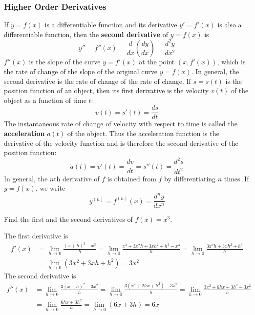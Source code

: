 \subsubsection*{Higher Order Derivatives}
 If \(y=f(x)\) is a differentiable function and its derivative \(y'=f'(x)\) is
 also a differentiable function,
 then the \textbf{second derivative} of \(y=f(x)\) is
\[y''=f''(x)=\frac{d}{dx}\left(\frac{dy}{dx}\right)=\frac{d^2y}{dx^2}\]
\(f''(x)\) is the slope of the curve \(y=f'(x)\) at the point \((x,f'(x))\),
which is the rate of change of the slope of the original curve \(y=f(x)\).
In general, the second derivative is the rate of change of the rate of change.
If \(s=s(t)\) is the position function of an object,
then its first derivative is the velocity \(v(t)\) of the object as a function
of time \(t\):
\[v(t)=s'(t)=\frac{ds}{dt}\]
The instantaneous rate of change of velocity with respect to time is called 
the \textbf{acceleration} \(a(t)\) of the object.
Thus the acceleration function is the derivative of the velocity
function and is therefore the second derivative of the position function:
\[a(t)=v'(t)=\frac{dv}{dt}=s''(t)=\frac{d^2s}{dt^2}\]
In general, the \(n\)th derivative of \(f\) is obtained from \(f\) by
differentiating \(n\) times.
If \(y=f(x)\), we write
\[y^{(n)}=f^{(n)}(x)=\frac{d^ny}{dx^n}\]
\begin{problem}
    Find the first and the second derivatives of \(f(x)=x^3\).
\end{problem}
\begin{solution}
    The first derivative is
    \begin{align*}
        f'(x) &= \lim_{h\to 0}\frac{(x+h)^3-x^3}{h}=\lim_{h\to 0}
        \frac{x^3+3x^2h+3xh^2+h^3-x^3}{h}
        =\lim_{h\to 0}\frac{3x^2h+3xh^2+h^3}{h} \\
        &= \lim_{h\to 0}(3x^2+3xh+h^2)=3x^2
    \end{align*}
    The second derivative is
    \begin{align*}
        f''(x) &= \lim_{h\to 0}\frac{3(x+h)^2-3x^2}{h}
        =\lim_{h\to 0}\frac{3(x^2+2hx+h^2)-3x^2}{h}
        =\lim_{h\to 0}\frac{3x^2+6hx+3h^2-3x^2}{h} \\
        &= \lim_{h\to 0}\frac{6hx+3h^2}{h}=\lim_{h\to 0}(6x+3h)=6x
    \end{align*}
\end{solution}